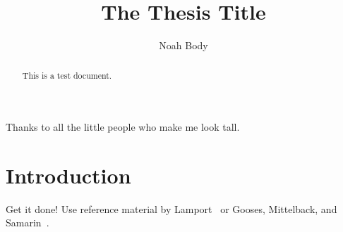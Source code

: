 \documentclass[12pt]{dalthesis}
\begin{document}
\title{The Thesis Title}
\author{Noah Body}

\mcs  %





\nolistoftables
\nolistoffigures

\frontmatter

\begin{abstract}
This is a test document.
\end{abstract}

\begin{acknowledgements}
Thanks to all the little people who make me look tall.
\end{acknowledgements}

\mainmatter

\chapter{Introduction}

Get it done!  Use reference material by Lamport~\cite{latex-by-lamport} or
Gooses, Mittelback, and Samarin~\cite{latex-companion}.
\end{document}
